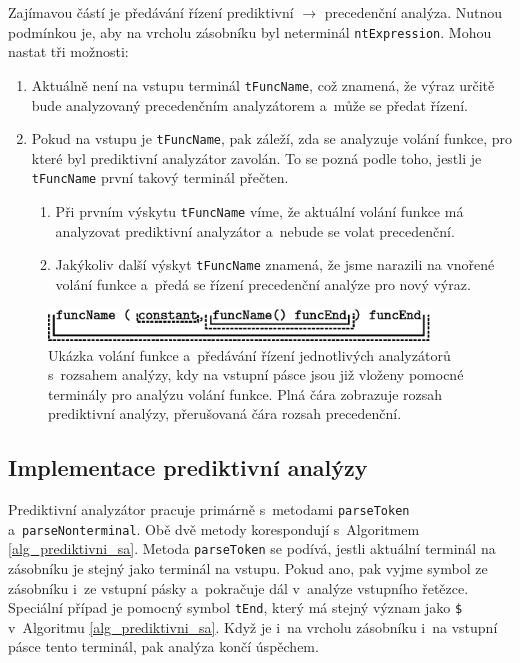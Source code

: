 Zajímavou částí je předávání řízení prediktivní $\rightarrow$ precedenční analýza.
Nutnou podmínkou je, aby na vrcholu zásobníku byl neterminál \texttt{nt\textunderscore Expression}.
Mohou nastat tři možnosti:
\begin{enumerate}
    \item Aktuálně není na vstupu terminál \texttt{t\textunderscore FuncName}, což znamená, že výraz určitě bude analyzovaný precedenčním analyzátorem a~může se předat řízení.
    \item Pokud na vstupu je \texttt{t\textunderscore FuncName}, pak záleží, zda se analyzuje volání funkce, pro které byl prediktivní analyzátor zavolán.
    To se pozná podle toho, jestli je \texttt{t\textunderscore FuncName} první takový terminál přečten.
    \begin{enumerate}
        \item Při prvním výskytu \texttt{t\textunderscore FuncName} víme, že aktuální volání funkce má analyzovat prediktivní analyzátor a~nebude se volat precedenční.
        \item Jakýkoliv další výskyt \texttt{t\textunderscore FuncName} znamená, že jsme narazili na vnořené volání funkce a~předá se řízení precedenční analýze pro nový výraz.
    \end{enumerate}  
\end{enumerate}

\begin{figure}[ht]
    \centering
    \includegraphics[width=0.9\textwidth]{obrazky-figures/volani_funkce.eps}
    \caption{Ukázka volání funkce a~předávání řízení jednotlivých analyzátorů s~rozsahem analýzy, kdy na vstupní pásce jsou již vloženy pomocné terminály pro analýzu volání funkce.
    Plná čára zobrazuje rozsah prediktivní analýzy, přerušovaná čára rozsah precedenční. }
    \label{hovno}
\end{figure}

\subsection*{Implementace prediktivní analýzy}
Prediktivní analyzátor pracuje primárně s~metodami \texttt{parseToken} a~\texttt{parseNonterminal}.
Obě dvě metody korespondují s~Algoritmem \ref{alg_prediktivni_sa}.
Metoda \texttt{parseToken} se podívá, jestli aktuální terminál na zásobníku je stejný jako terminál na vstupu.
Pokud ano, pak vyjme symbol ze zásobníku i~ze vstupní pásky a~pokračuje dál v~analýze vstupního řetězce.
Speciální případ je pomocný symbol \texttt{t\textunderscore End}, který má stejný význam jako \texttt{\$} v~Algoritmu \ref{alg_prediktivni_sa}.
Když je i~na vrcholu zásobníku i~na vstupní pásce tento terminál, pak analýza končí úspěchem.

